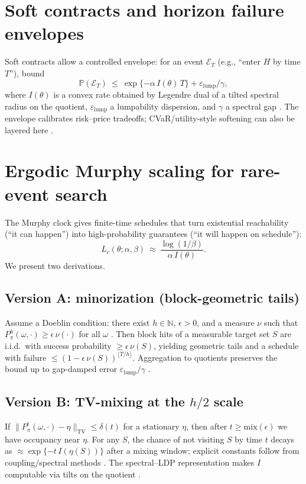 \documentclass[11pt]{article}
\theoremstyle{plain}
\theoremstyle{definition}
\theoremstyle{remark}
\newcommand{\Prob}{\mathbb{P}}
\newcommand{\1}{\mathbbm{1}}
\newcommand{\TV}{\mathrm{TV}}
\newcommand{\mix}{\mathrm{mix}}
\begin{document}
\section{Soft contracts and horizon failure envelopes}\label{sec:soft}
Soft contracts allow a controlled envelope: for an event \(\mathcal{E}_T\) (e.g., “enter \(H\) by time \(T\)”), bound
\[
\Prob(\mathcal{E}_T)\ \le\ \exp\{-\alpha\, I(\theta)\, T\} + \varepsilon_{\mathrm{lump}}/\gamma,
\]
where \(I(\theta)\) is a convex rate obtained by Legendre dual of a tilted spectral radius on the quotient, \(\varepsilon_{\mathrm{lump}}\) a lumpability dispersion, and \(\gamma\) a spectral gap \parencite{DemboZeitouni1998,elliott2025qfi}. The envelope calibrates risk–price tradeoffs; CVaR/utility-style softening can also be layered here \parencite{RockafellarUryasev2000}.

\section{Ergodic Murphy scaling for rare-event search}\label{sec:murphy}
The Murphy clock gives finite-time schedules that turn existential reachability (“it can happen”) into high-probability guarantees (“it will happen on schedule”):
\[
L_c(\theta;\alpha,\beta)\ \approx\ \frac{\log(1/\beta)}{\alpha\, I(\theta)}.
\]
We present two derivations.

\subsection{Version A: minorization (block-geometric tails)}\label{sec:minor}
Assume a Doeblin condition: there exist \(h\in\mathbb{N}\), \(\epsilon>0\), and a measure \(\nu\) such that \(P_\pi^h(\omega,\cdot)\ge \epsilon\,\nu(\cdot)\) for all \(\omega\) \parencite[Ch.~16]{MeynTweedie2009}. Then block hits of a measurable target set \(S\) are i.i.d.\ with success probability \(\ge \epsilon\,\nu(S)\), yielding geometric tails and a schedule with failure \(\le (1-\epsilon\,\nu(S))^{\lfloor T/h\rfloor}\). Aggregation to quotients preserves the bound up to gap-damped error \(\varepsilon_{\mathrm{lump}}/\gamma\) \parencite{elliott2025qfi}.

\subsection{Version B: TV-mixing at the \texorpdfstring{$h/2$}{h/2} scale}\label{sec:mix}
If \(\|P_\pi^t(\omega,\cdot)-\eta\|_{\TV}\le \delta(t)\) for a stationary \(\eta\), then after \(t\ge \mix(\epsilon)\) we have occupancy near \(\eta\). For any \(S\), the chance of not visiting \(S\) by time \(t\) decays as \(\approx \exp\{-t\,I(\eta(S))\}\) after a mixing window; explicit constants follow from coupling/spectral methods \parencite[Chs.~4--12]{LevinPeresWilmer2009}. The spectral–LDP representation makes \(I\) computable via tilts on the quotient \parencite{DemboZeitouni1998,elliott2025qfi}.
\end{document}
